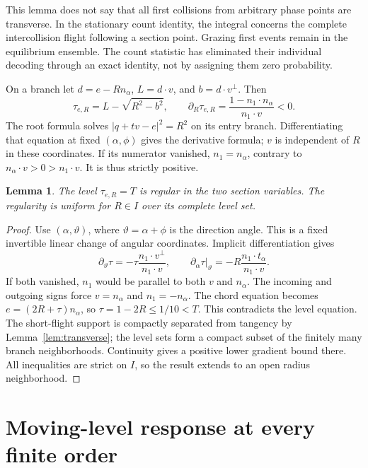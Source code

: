 \documentclass[11pt,reqno]{amsart}
\numberwithin{equation}{section}
\newtheorem{lemma}[theorem]{Lemma}
\theoremstyle{remark}\newtheorem{remark}[theorem]{Remark}
\begin{document}
This lemma does not say that all first collisions from arbitrary phase points are transverse. In the stationary count identity, the integral concerns the complete intercollision flight following a section point. Grazing first events remain in the equilibrium ensemble. The count statistic has eliminated their individual decoding through an exact identity, not by assigning them zero probability.

On a branch let $d=e-Rn_\alpha$, $L=d\cdot v$, and $b=d\cdot v^\perp$. Then
\begin{equation}\label{eq:root}
 \tau_{e,R}=L-\sqrt{R^2-b^2},\qquad
 \partial_R\tau_{e,R}=\frac{1-n_1\cdot n_\alpha}{n_1\cdot v}<0.
\end{equation}
The root formula solves $|q+tv-e|^2=R^2$ on its entry branch. Differentiating that equation at fixed $(\alpha,\phi)$ gives the derivative formula; $v$ is independent of $R$ in these coordinates. If its numerator vanished, $n_1=n_\alpha$, contrary to $n_\alpha\cdot v>0>n_1\cdot v$. It is thus strictly positive.

\begin{lemma}\label{lem:regularlevel}
The level $\tau_{e,R}=T$ is regular in the two section variables. The regularity is uniform for $R\in I$ over its complete level set.
\end{lemma}
\begin{proof}
Use $(\alpha,\vartheta)$, where $\vartheta=\alpha+\phi$ is the direction angle. This is a fixed invertible linear change of angular coordinates. Implicit differentiation gives
\[
 \partial_\vartheta\tau=-\tau\frac{n_1\cdot v^\perp}{n_1\cdot v},
 \qquad \partial_\alpha\tau\big|_\vartheta=-R\frac{n_1\cdot t_\alpha}{n_1\cdot v}.
\]
If both vanished, $n_1$ would be parallel to both $v$ and $n_\alpha$. The incoming and outgoing signs force $v=n_\alpha$ and $n_1=-n_\alpha$. The chord equation becomes $e=(2R+\tau)n_\alpha$, so $\tau=1-2R\le1/10<T$. This contradicts the level equation. The short-flight support is compactly separated from tangency by Lemma~\ref{lem:transverse}; the level sets form a compact subset of the finitely many branch neighborhoods. Continuity gives a positive lower gradient bound there. All inequalities are strict on $I$, so the result extends to an open radius neighborhood.
\end{proof}

\section{Moving-level response at every finite order}
\end{document}

